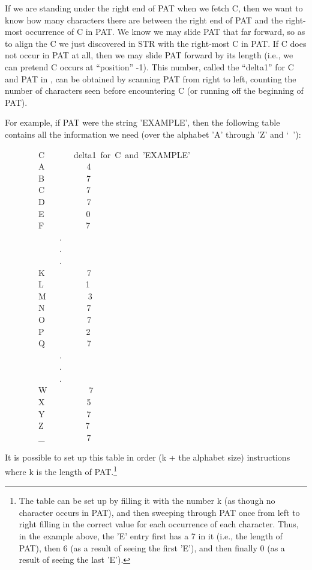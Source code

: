 \documentclass[11pt]{book}
\newenvironment{pubasis}{\begin{flushleft}\ttfamily\small}{\normalsize\rmfamily\end{flushleft}}
\begin{document}
If we are standing under the right end of PAT when we fetch C,
then we want to know how many characters there are between
the right end of PAT and the right-most occurrence of C in PAT.
We know we may slide PAT that far forward, so as to align the C we
just discovered in STR with the right-most C in PAT.
If C does not occur in PAT at all, then we may slide PAT forward
by its length (i.e., we can pretend C occurs at ``position'' -1).
This number, called the ``delta1'' for C and PAT in \cite{FSTRPOS},
can be obtained by scanning PAT from right to left, counting
the number of characters seen before encountering C (or running off the
beginning of PAT).

For example, if PAT were the string 'EXAMPLE', then the
following table contains all the information we need (over the alphabet 'A' through 'Z' and `\verb*+ +'):
\begin{pubasis}
~~~~~~~~C~~~~~~~delta1~for~C~and~'EXAMPLE'\\

~~~~~~~~A~~~~~~~~~~4\\
~~~~~~~~B~~~~~~~~~~7\\
~~~~~~~~C~~~~~~~~~~7\\
~~~~~~~~D~~~~~~~~~~7\\
~~~~~~~~E~~~~~~~~~~0\\
~~~~~~~~F~~~~~~~~~~7\\
~~~~~~~~~~~~~.\\
~~~~~~~~~~~~~.\\
~~~~~~~~~~~~~.\\
~~~~~~~~K~~~~~~~~~~7\\
~~~~~~~~L~~~~~~~~~~1\\
~~~~~~~~M~~~~~~~~~~3\\
~~~~~~~~N~~~~~~~~~~7\\
~~~~~~~~O~~~~~~~~~~7\\
~~~~~~~~P~~~~~~~~~~2\\
~~~~~~~~Q~~~~~~~~~~7\\
~~~~~~~~~~~~~.\\
~~~~~~~~~~~~~.\\
~~~~~~~~~~~~~.\\
~~~~~~~~W~~~~~~~~~~7\\
~~~~~~~~X~~~~~~~~~~5\\
~~~~~~~~Y~~~~~~~~~~7\\
~~~~~~~~Z~~~~~~~~~~7\\
~~~~~~~~\_~~~~~~~~~~7\\
\end{pubasis}
It is possible to set up this table in order (k + the alphabet size)
instructions where
k is the length of PAT.\footnote{The table can be set up by filling it with the number k (as though no character occurs in PAT), and then sweeping through PAT once from left to right filling in the correct value for each occurrence of each character.  Thus, in the example above, the 'E' entry first has a 7 in it (i.e., the length of PAT), then 6 (as a result of seeing the first 'E'), and then finally 0 (as a result of seeing the last 'E').}
\end{document}
